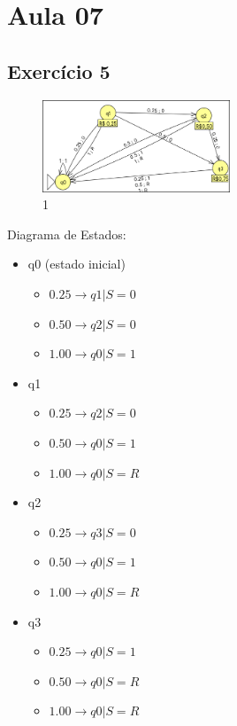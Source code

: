 \section{Aula 07}
    \subsection{Exercício 5}
        \begin{figure}[H]
            \centering
            \includegraphics[width=0.5\textwidth]{images/Aula07/1.png}
            \caption*{1}
        \end{figure}
        Diagrama de Estados:
        \begin{itemize}
            \item q0 (estado inicial)
                \begin{itemize}
                    \item $0.25 \to q1 | S = 0$
                    \item $0.50 \to q2 | S = 0$
                    \item $1.00 \to q0 | S = 1$
                \end{itemize}
            \item q1
                \begin{itemize}
                    \item $0.25 \to q2 | S = 0$
                    \item $0.50 \to q0 | S = 1$
                    \item $1.00 \to q0 | S = R$
                \end{itemize}
            \item q2
                \begin{itemize}
                    \item $0.25 \to q3 | S = 0$
                    \item $0.50 \to q0 | S = 1$
                    \item $1.00 \to q0 | S = R$
                \end{itemize}
            \item q3
                \begin{itemize}
                    \item $0.25 \to q0 | S = 1$
                    \item $0.50 \to q0 | S = R$
                    \item $1.00 \to q0 | S = R$
                \end{itemize}                
        \end{itemize}
    
